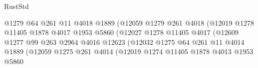 \begin{lexlean}{RustStd}
\begin{coremodule}
{\begin{coremodule}
{{{{{{{{{{{{{{{{{{{{{{{{{{{{{                                            @1279
                                            @64
                                            @261
                                            @11
                                            @4018
                                            @1889
                                            (@12059
                                              @1279
                                              @261
                                              @4018
                                              (@12019
                                                @1278
                                                @11405
                                                @1878
                                                @4017
                                                @1953
                                                @5860
                                                (@12027
                                                  @1278
                                                  @11405
                                                  @4017
                                                  (@12609
                                                    @1277
                                                    @99
                                                    @263
                                                    @2964
                                                    @4016
                                                    @12623
                                                    (@12032
                                                      @1275
                                                      @64
                                                      @261
                                                      @11
                                                      @4014
                                                      @1889
                                                      (@12059
                                                        @1275
                                                        @261
                                                        @4014
                                                        (@12019
                                                          @1274
                                                          @11405
                                                          @1878
                                                          @4013
                                                          @1953
                                                          @5860
}}}}}}}}}}}}}}}}}}}}}}}}}}}}}
\end{coremodule}}
\end{coremodule}
\end{lexlean}
